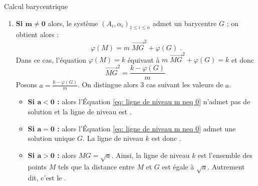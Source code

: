 \begin{chapter}{Calcul barycentrique}
\begin{enumerate}
\item \textbf{Si $\mathbf{m \neq 0}$ }
      alors, le syst\`eme $(A_i , \alpha_i)_{1\leq i\leq n}$ admet un barycentre $G$ ; on obtient alors : 
      $$
      \varphi (M) = m \; {\overrightarrow{MG}}^2 + \varphi (G)
      \; .
      $$ 
      Dans ce cas, l'\'equation $\varphi (M) = k$ \'equivaut \`a $ m \; {\overrightarrow{MG}}^2 + \varphi (G) = k$ et donc 
      \begin{equation} \label{eq: ligne de niveau m neq 0}
      {\overrightarrow{MG}}^2 = \frac{k - \varphi (G)}{m}      
      \; 
      \end{equation}
      Posons $a = \frac{k - \varphi (G)}{m}$.
      On distingue alors 3 cas suivant les valeurs de $a$.
      \begin{itemize} 
      \item \textbf{Si $\mathbf{a < 0}$ :} 
            alors l'\'Equation \eqref{eq: ligne de niveau m neq 0} n'admet pas de solution et 
            la ligne de niveau est \propbox{$\emptyset$}.
      \item \textbf{Si $\mathbf{a = 0}$ :} 
            alors l'\'Equation \eqref{eq: ligne de niveau m neq 0} admet une solution unique $G$.
            La ligne de niveau $k$ est donc .
      \item \textbf{Si $\mathbf{a > 0}$ :} 
            alors $MG = \sqrt{a} $.
            Ainsi, la ligne de niveau $k$ est l'ensemble des points $M$ tels que 
            la distance entre $M$ et $G$ est \'egale \`a $\sqrt{a}$.
            Autrement dit, c'est le
            .
      \end{itemize}
\end{enumerate}


























\end{chapter}

\TCDLessonStyleOff
\clearpage
\providecommand{\Plan}{(\mathscr{P})}
\providecommand{\mes}[2]{\mathrm{mes}\left( \widehat{ \overrightarrow{#1} , \overrightarrow{#2} } \right)}
